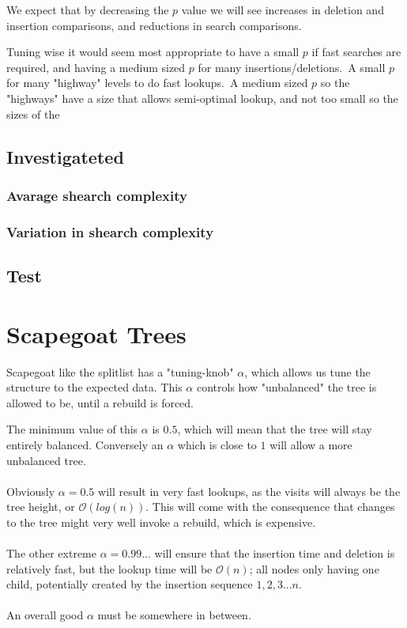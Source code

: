 \documentclass[oneside]{scrbook}
\begin{document}
We expect that by decreasing the $p$ value we will see increases in deletion and insertion comparisons, and reductions in search comparisons.

Tuning wise it would seem most appropriate to have a small $p$ if fast searches are required, and having a medium sized $p$ for many insertions/deletions.\
A small $p$ for many "highway" levels to do fast lookups.\
A medium sized $p$ so the "highways" have a size that allows semi-optimal lookup, and not too small so the sizes of the

\section{Investigateted}
\subsection{Avarage shearch complexity}
\subsection{Variation in shearch complexity}
\section{Test}
\chapter{Scapegoat Trees}
Scapegoat like the splitlist has a "tuning-knob" $\alpha$, which allows us tune the structure to the expected data.
This $\alpha$ controls how "unbalanced" the tree is allowed to be, until a rebuild is forced.

The minimum value of this $\alpha$ is $0.5$, which will mean that the tree will stay entirely balanced.
Conversely an $\alpha$ which is close to $1$ will allow a more unbalanced tree.
\\\\
Obviously $\alpha = 0.5$ will result in very fast lookups, as the visits will always be the tree height, or $\mathcal{O}(log(n))$.
This will come with the consequence that changes to the tree might very well invoke a rebuild, which is expensive.
\\\\
The other extreme $\alpha = 0.99...$ will ensure that the insertion time and deletion is relatively fast, but the lookup time will be $\mathcal{O}(n)$;
all nodes only having one child, potentially created by the insertion sequence $1,2,3... n$.
\\\\
An overall good $\alpha$ must be somewhere in between.
\end{document}
